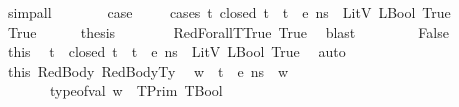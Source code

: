 \begin{isabellebody}
\ simp{\isacharunderscore}{\kern0pt}all\isanewline
\ \ \ \isamarkupfalse%
\isanewline
\ \ \isamarkupfalse%
\ {\isacharquery}{\kern0pt}case\ \isanewline
\ \ \isamarkupfalse%
\ {\isacharparenleft}{\kern0pt}cases\ {\isachardoublequoteopen}{\isasymforall}t{\isachardot}{\kern0pt}\ closed\ t\ {\isasymlongrightarrow}\ {\isasymLambda}{\isacharcomma}{\kern0pt}{\isasymGamma}{\isacharcomma}{\kern0pt}t{\isacharhash}{\kern0pt}{\isasymOmega}\ {\isasymturnstile}\ {\isasymlangle}e{\isacharcomma}{\kern0pt}\ n{\isacharunderscore}{\kern0pt}s{\isasymrangle}\ {\isasymDown}\ LitV\ {\isacharparenleft}{\kern0pt}LBool\ True{\isacharparenright}{\kern0pt}{\isachardoublequoteclose}{\isacharparenright}{\kern0pt}\isanewline
\ \ \ \ \isamarkupfalse%
\ True\isanewline
\ \ \ \ \isamarkupfalse%
\ {\isacharquery}{\kern0pt}thesis\isanewline
\ \ \ \ \ \ \isamarkupfalse%
\ RedForallT{\isacharunderscore}{\kern0pt}True\ True\ \isamarkupfalse%
\ blast\isanewline
\ \ \isamarkupfalse%
\isanewline
\ \ \ \ \isamarkupfalse%
\ False\isanewline
\ \ \ \ \isamarkupfalse%
\ this\ \isamarkupfalse%
\ t\ \ {\isachardoublequoteopen}closed\ t{\isachardoublequoteclose}\ \ {\isachardoublequoteopen}{\isasymnot}{\isacharparenleft}{\kern0pt}{\isasymLambda}{\isacharcomma}{\kern0pt}{\isasymGamma}{\isacharcomma}{\kern0pt}t{\isacharhash}{\kern0pt}{\isasymOmega}\ {\isasymturnstile}\ {\isasymlangle}e{\isacharcomma}{\kern0pt}\ n{\isacharunderscore}{\kern0pt}s{\isasymrangle}\ {\isasymDown}\ LitV\ {\isacharparenleft}{\kern0pt}LBool\ True{\isacharparenright}{\kern0pt}{\isacharparenright}{\kern0pt}{\isachardoublequoteclose}\ \isamarkupfalse%
\ auto\isanewline
\ \ \ \ \isamarkupfalse%
\ \isamarkupfalse%
\ this\ RedBody\ RedBodyTy\ \isamarkupfalse%
\ w{\isacharprime}{\kern0pt}\ \ {\isachardoublequoteopen}{\isasymLambda}{\isacharcomma}{\kern0pt}{\isasymGamma}{\isacharcomma}{\kern0pt}{\isacharparenleft}{\kern0pt}t{\isacharhash}{\kern0pt}{\isasymOmega}{\isacharparenright}{\kern0pt}\ {\isasymturnstile}\ {\isasymlangle}e{\isacharcomma}{\kern0pt}\ n{\isacharunderscore}{\kern0pt}s{\isasymrangle}\ {\isasymDown}\ w{\isacharprime}{\kern0pt}{\isachardoublequoteclose}\isanewline
\ \ \ \ \ \ \ {\isachardoublequoteopen}type{\isacharunderscore}{\kern0pt}of{\isacharunderscore}{\kern0pt}val\ w{\isacharprime}{\kern0pt}\ {\isacharequal}{\kern0pt}\ TPrim\ {\isacharparenleft}{\kern0pt}TBool{\isacharparenright}{\kern0pt}{\isachardoublequoteclose}\ \isamarkupfalse%

\end{isabellebody}
